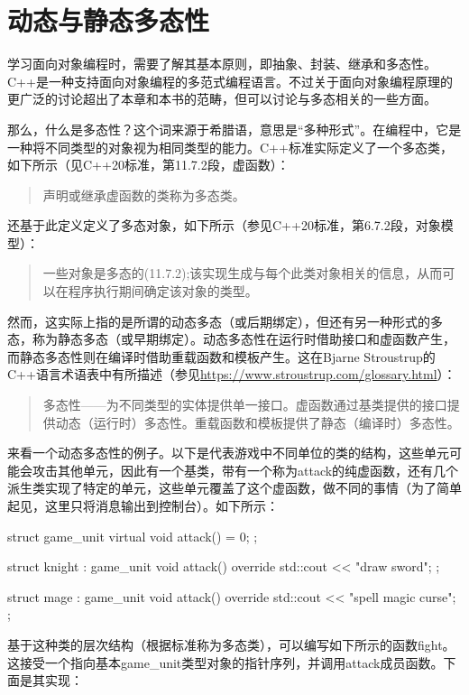 \section{动态与静态多态性}
学习面向对象编程时，需要了解其基本原则，即抽象、封装、继承和多态性。C++是一种支持面向对象编程的多范式编程语言。不过关于面向对象编程原理的更广泛的讨论超出了本章和本书的范畴，但可以讨论与多态相关的一些方面。

那么，什么是多态性？这个词来源于希腊语，意思是“多种形式”。在编程中，它是一种将不同类型的对象视为相同类型的能力。C++标准实际定义了一个多态类，如下所示（见C++20标准，第11.7.2段，虚函数）：

\begin{quote}
声明或继承虚函数的类称为多态类。
\end{quote}

还基于此定义定义了多态对象，如下所示（参见C++20标准，第6.7.2段，对象模型）：

\begin{quote}
一些对象是多态的(11.7.2);该实现生成与每个此类对象相关的信息，从而可以在程序执行期间确定该对象的类型。
\end{quote}

然而，这实际上指的是所谓的动态多态（或后期绑定），但还有另一种形式的多态，称为静态多态（或早期绑定）。动态多态性在运行时借助接口和虚函数产生，而静态多态性则在编译时借助重载函数和模板产生。这在Bjarne Stroustrup的C++语言术语表中有所描述（参见\url{https://www.stroustrup.com/glossary.html}）：

\begin{quote}
多态性——为不同类型的实体提供单一接口。虚函数通过基类提供的接口提供动态（运行时）多态性。重载函数和模板提供了静态（编译时）多态性。
\end{quote}

来看一个动态多态性的例子。以下是代表游戏中不同单位的类的结构，这些单元可能会攻击其他单元，因此有一个基类，带有一个称为attack的纯虚函数，还有几个派生类实现了特定的单元，这些单元覆盖了这个虚函数，做不同的事情（为了简单起见，这里只将消息输出到控制台）。如下所示：

\begin{cppcode}
struct game_unit
{
	virtual void attack() = 0;
};

struct knight : game_unit
{
	void attack() override
	{ std::cout << "draw sword\n"; }
};

struct mage : game_unit
{
	void attack() override
	{ std::cout << "spell magic curse\n"; }
};
\end{cppcode}

基于这种类的层次结构（根据标准称为多态类），可以编写如下所示的函数fight。这接受一个指向基本game_unit类型对象的指针序列，并调用attack成员函数。下面是其实现：

